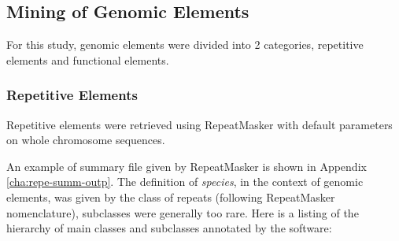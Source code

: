 \subsection{Mining of Genomic Elements}

For this study, genomic elements were divided into 2 categories, repetitive elements and functional elements.

\subsubsection{Repetitive Elements}

Repetitive elements were retrieved using RepeatMasker \cite{Smit2010} with default parameters on whole chromosome sequences.

An example of summary file given by RepeatMasker is shown in Appendix \ref{cha:repe-summ-outp}. The definition of \textit{species}, in the context of genomic elements, was given by the class of repeats (following RepeatMasker nomenclature), subclasses were generally too rare. Here is a listing of the hierarchy of main classes and subclasses annotated by the software:
